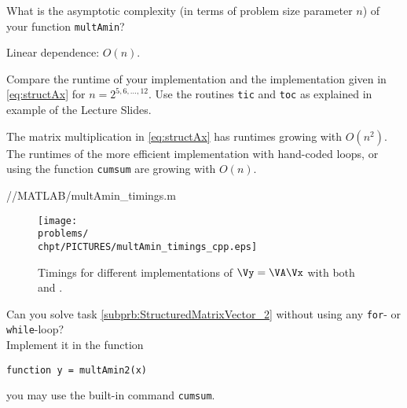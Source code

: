 \begin{problem}
\begin{subproblem}[3]
\end{subproblem}

\begin{subproblem}[1] \label{subprb:StructuredMatrixVector_3}
What is the asymptotic complexity (in terms of problem size parameter $n$) of your function \texttt{multAmin}?

\begin{solution}
Linear dependence: $O(n)$.
\end{solution}
%
\end{subproblem}


\begin{subproblem}[2] \label{subprb:StructuredMatrixVector_4}
Compare the runtime of your implementation and the implementation given in \eqref{eq:structAx} for $n=2^{5,6,\ldots,12}$.
Use the routines \texttt{tic} and \texttt{toc} as explained in example  of the Lecture Slides.

\begin{solution}
 
The matrix multiplication in \eqref{eq:structAx} has runtimes growing with $O(n^2)$.
The runtimes of the more efficient implementation with hand-coded loops, or using the \Matlab function \texttt{cumsum} are growing with $O(n)$.
%

{\problems/\chpt/MATLAB/multAmin_timings.m}
%
% 

\begin{figure}[ht]
\centering
\label{fig:multAmin_timings}
\texttt{[image: \\problems/\\chpt/PICTURES/multAmin\_timings\_cpp.eps]}
\caption{Timings for different implementations of $\Vy=\VA\Vx$ with both \Matlab and \Cpp.}
\end{figure}

\end{solution}
\end{subproblem}

\begin{subproblem}[3] \label{subprb:StructuredMatrixVector_5}
Can you solve task \ref{subprb:StructuredMatrixVector_2} without using any \texttt{for}- or \texttt{while}-loop?\\
Implement it in the function
%
\begin{center}
\texttt{function y = multAmin2(x)}
\end{center}
%
\begin{hint}
 you may use the \Matlab built-in command \texttt{cumsum}.
\end{hint}


\end{subproblem}
\end{problem}
